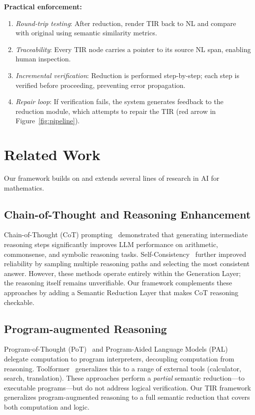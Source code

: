 \documentclass[11pt,a4paper]{article}
\begin{document}
\textbf{Practical enforcement:}
\begin{enumerate}[leftmargin=*]
    \item \textit{Round-trip testing}: After reduction, render TIR back to NL and compare with original using semantic similarity metrics.
    \item \textit{Traceability}: Every TIR node carries a pointer to its source NL span, enabling human inspection.
    \item \textit{Incremental verification}: Reduction is performed step-by-step; each step is verified before proceeding, preventing error propagation.
    \item \textit{Repair loop}: If verification fails, the system generates feedback to the reduction module, which attempts to repair the TIR (red arrow in Figure~\ref{fig:pipeline}).
\end{enumerate}

\section{Related Work}
\label{sec:related}

Our framework builds on and extends several lines of research in AI for mathematics.

\subsection{Chain-of-Thought and Reasoning Enhancement}

Chain-of-Thought (CoT) prompting~\cite{wei2022chain} demonstrated that generating intermediate reasoning steps significantly improves LLM performance on arithmetic, commonsense, and symbolic reasoning tasks. Self-Consistency~\cite{wang2022self} further improved reliability by sampling multiple reasoning paths and selecting the most consistent answer. However, these methods operate entirely within the Generation Layer; the reasoning itself remains unverifiable. Our framework complements these approaches by adding a Semantic Reduction Layer that makes CoT reasoning checkable.

\subsection{Program-augmented Reasoning}

Program-of-Thought (PoT)~\cite{chen2022program} and Program-Aided Language Models (PAL)~\cite{gao2022pal} delegate computation to program interpreters, decoupling computation from reasoning. Toolformer~\cite{schick2023toolformer} generalizes this to a range of external tools (calculator, search, translation). These approaches perform a \textit{partial} semantic reduction---to executable programs---but do not address logical verification. Our TIR framework generalizes program-augmented reasoning to a full semantic reduction that covers both computation and logic.
\end{document}
